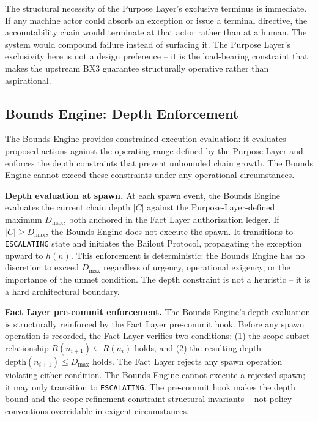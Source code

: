 The structural necessity of the Purpose Layer's exclusive terminus is immediate. If any machine actor could absorb an exception or issue a terminal directive, the accountability chain would terminate at that actor rather than at a human. The system would compound failure instead of surfacing it. The Purpose Layer's exclusivity here is not a design preference -- it is the load-bearing constraint that makes the upstream BX3 guarantee structurally operative rather than aspirational.

\subsection{Bounds Engine: Depth Enforcement}
\label{sec:rs-bounds-depth}

The Bounds Engine provides constrained execution evaluation: it evaluates proposed actions against the operating range defined by the Purpose Layer and enforces the depth constraints that prevent unbounded chain growth. The Bounds Engine cannot exceed these constraints under any operational circumstances.

\medskip
\noindent\textbf{Depth evaluation at spawn.} At each spawn event, the Bounds Engine evaluates the current chain depth $|C|$ against the Purpose-Layer-defined maximum $D_{\mathrm{max}}$, both anchored in the Fact Layer authorization ledger. If $|C| \geq D_{\mathrm{max}}$, the Bounds Engine does not execute the spawn. It transitions to \texttt{ESCALATING} state and initiates the Bailout Protocol, propagating the exception upward to $h(n)$. This enforcement is deterministic: the Bounds Engine has no discretion to exceed $D_{\mathrm{max}}$ regardless of urgency, operational exigency, or the importance of the unmet condition. The depth constraint is not a heuristic -- it is a hard architectural boundary.

\medskip
\noindent\textbf{Fact Layer pre-commit enforcement.} The Bounds Engine's depth evaluation is structurally reinforced by the Fact Layer pre-commit hook. Before any spawn operation is recorded, the Fact Layer verifies two conditions: (1) the scope subset relationship $R(n_{i+1}) \subseteq R(n_i)$ holds, and (2) the resulting depth $\mathrm{depth}(n_{i+1}) \leq D_{\mathrm{max}}$ holds. The Fact Layer rejects any spawn operation violating either condition. The Bounds Engine cannot execute a rejected spawn; it may only transition to \texttt{ESCALATING}. The pre-commit hook makes the depth bound and the scope refinement constraint structural invariants -- not policy conventions overridable in exigent circumstances.

